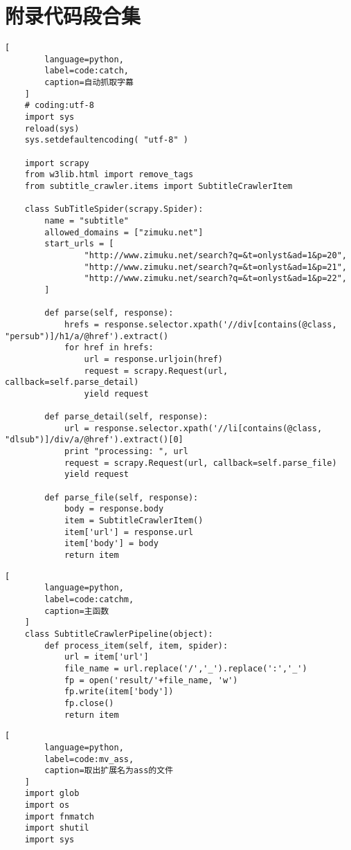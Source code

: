 \begin{appendices}\label{sec:appendices}
    \section*{附录代码段合集} \label{sec:testlistings}
    \begin{lstlisting}[
        language=python,
        label=code:catch,
        caption=自动抓取字幕
    ]
    # coding:utf-8
    import sys
    reload(sys)
    sys.setdefaultencoding( "utf-8" )
    
    import scrapy
    from w3lib.html import remove_tags
    from subtitle_crawler.items import SubtitleCrawlerItem
    
    class SubTitleSpider(scrapy.Spider):
        name = "subtitle"
        allowed_domains = ["zimuku.net"]
        start_urls = [
                "http://www.zimuku.net/search?q=&t=onlyst&ad=1&p=20",
                "http://www.zimuku.net/search?q=&t=onlyst&ad=1&p=21",
                "http://www.zimuku.net/search?q=&t=onlyst&ad=1&p=22",
        ]
    
        def parse(self, response):
            hrefs = response.selector.xpath('//div[contains(@class, "persub")]/h1/a/@href').extract()
            for href in hrefs:
                url = response.urljoin(href)
                request = scrapy.Request(url, callback=self.parse_detail)
                yield request
    
        def parse_detail(self, response):
            url = response.selector.xpath('//li[contains(@class, "dlsub")]/div/a/@href').extract()[0]
            print "processing: ", url
            request = scrapy.Request(url, callback=self.parse_file)
            yield request
    
        def parse_file(self, response):
            body = response.body
            item = SubtitleCrawlerItem()
            item['url'] = response.url
            item['body'] = body
            return item
    \end{lstlisting}
    \begin{lstlisting}[
        language=python,
        label=code:catchm,
        caption=主函数
    ]
    class SubtitleCrawlerPipeline(object):
        def process_item(self, item, spider):
            url = item['url']
            file_name = url.replace('/','_').replace(':','_')
            fp = open('result/'+file_name, 'w')
            fp.write(item['body'])
            fp.close()
            return item
    \end{lstlisting}
    \begin{lstlisting}[
        language=python,
        label=code:mv_ass,
        caption=取出扩展名为ass的文件
    ]
    import glob
    import os
    import fnmatch
    import shutil
    import sys
    

\end{lstlisting}
\end{appendices}
